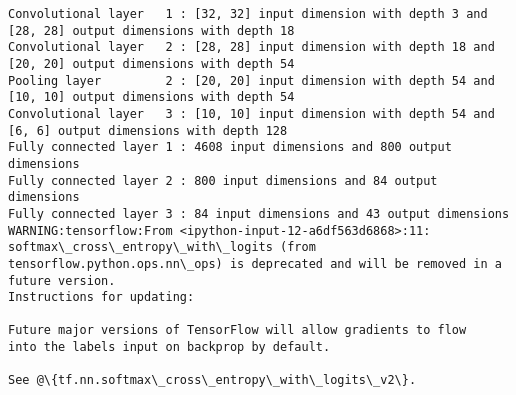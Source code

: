 \documentclass[11pt]{article}
\begin{document}
    \begin{Verbatim}[commandchars=\\\{\}]
Convolutional layer   1 : [32, 32] input dimension with depth 3 and [28, 28] output dimensions with depth 18
Convolutional layer   2 : [28, 28] input dimension with depth 18 and [20, 20] output dimensions with depth 54
Pooling layer         2 : [20, 20] input dimension with depth 54 and [10, 10] output dimensions with depth 54
Convolutional layer   3 : [10, 10] input dimension with depth 54 and [6, 6] output dimensions with depth 128
Fully connected layer 1 : 4608 input dimensions and 800 output dimensions
Fully connected layer 2 : 800 input dimensions and 84 output dimensions
Fully connected layer 3 : 84 input dimensions and 43 output dimensions
WARNING:tensorflow:From <ipython-input-12-a6df563d6868>:11: softmax\_cross\_entropy\_with\_logits (from tensorflow.python.ops.nn\_ops) is deprecated and will be removed in a future version.
Instructions for updating:

Future major versions of TensorFlow will allow gradients to flow
into the labels input on backprop by default.

See @\{tf.nn.softmax\_cross\_entropy\_with\_logits\_v2\}.


    \end{Verbatim}
\end{document}
